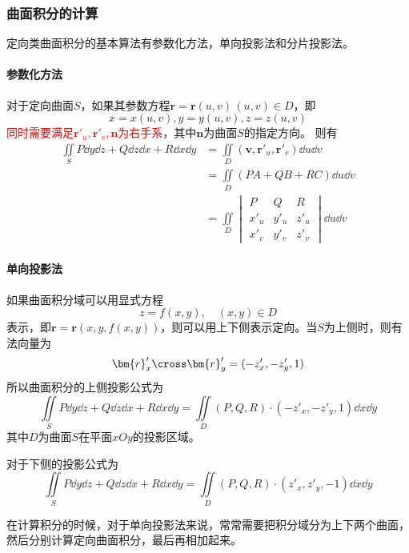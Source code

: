 \subsubsection{曲面积分的计算}
定向类曲面积分的基本算法有参数化方法，单向投影法和分片投影法。
\paragraph{参数化方法}
对于定向曲面$S$，如果其参数方程$\bm{r}=\bm{r}(u,v)\,(u,v)\in D$，即
\[ x=x(u,v),y=y(u,v),z=z(u,v) \]
\textcolor{red}{同时需要满足$\bm{r}'_u,\bm{r}'_v,\bm{n}$为右手系}，其中$\bm{n}$为曲面$S$的指定方向。
则有
\begin{align*}
    \iint\limits_S P\dd{y}\dd{z} + Q\dd{z}\dd{x} + R\dd{x}\dd{y}
     & = \iint\limits_D (\bm{v},\bm{r}'_u, \bm{r}'_v) \dd{u}\dd{v} \\
     & = \iint\limits_D (PA+QB+RC)\dd{u}\dd{v}                     \\
     & = \iint\limits_D
    \begin{vmatrix}
        P    & Q    & R    \\
        x'_u & y'_u & z'_u \\
        x'_v & y'_v & z'_v
    \end{vmatrix}
    \dd{u}\dd{v}
\end{align*}

\paragraph{单向投影法}
如果曲面积分域可以用显式方程
\[ z=f(x,y),\quad (x,y)\in D \]
表示，即$\bm{r} = \bm{r}(x,y,f(x,y))$，则可以用上下侧表示定向。当$S$为上侧时，则有法向量为
\[ \bm{r}'_x\cross\bm{r}'_y = (-z'_x, -z'_y, 1) \]
所以曲面积分的上侧投影公式为
\begin{equation}
    \iint\limits_S P\dd{y}\dd{z} + Q\dd{z}\dd{x} + R\dd{x}\dd{y} = \iint\limits_D (P,Q,R)\cdot(-z'_x,-z'_y,1)\dd{x}\dd{y}
\end{equation}
其中$D$为曲面$S$在平面$xOy$的投影区域。

对于下侧的投影公式为
\begin{equation}
    \iint\limits_S P\dd{y}\dd{z} + Q\dd{z}\dd{x} + R\dd{x}\dd{y} = \iint\limits_D (P,Q,R)\cdot(z'_x,z'_y,-1)\dd{x}\dd{y}
\end{equation}

在计算积分的时候，对于单向投影法来说，常常需要把积分域分为上下两个曲面，然后分别计算定向曲面积分，最后再相加起来。

